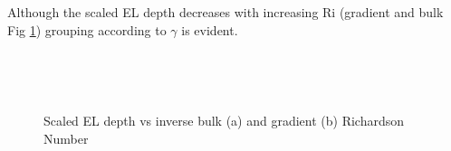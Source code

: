 
Although the scaled \acs{EL} depth decreases with increasing \acs{Ri} (gradient and bulk Fig \ref{fig:scaledeltahinvri})
grouping according to $\gamma$ is evident.\\

\begin{figure}[htbp]
\begin{minipage}[b]{0.5\linewidth}
        \\
        \end{minipage}             
\quad
\begin{minipage}[b]{0.5\linewidth}
        \\
       
       \end{minipage}
        \caption{Scaled EL depth vs inverse bulk (a)  and gradient (b) Richardson Number}
        \label{fig:scaledeltahinvri}
\end{figure}



\begin{figure}[htbp]
\begin{minipage}[b]{0.5\linewidth}
        \\
        \end{minipage}             
\quad
\begin{minipage}[b]{0.5\linewidth}
        \\
       
       \end{minipage}
        \caption{}
        \label{fig:}
\end{figure}


